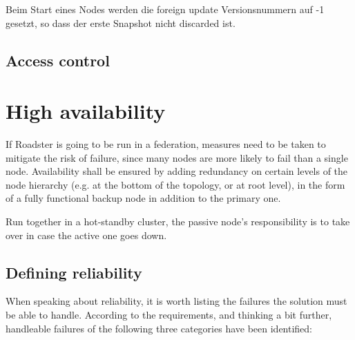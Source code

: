 Beim Start eines Nodes werden die foreign update Versionsnummern auf -1 gesetzt, so
dass der erste Snapshot nicht discarded ist.




\subsection{Access control}

\section{High availability}\label{sec:approach:ha}
If Roadster is going to be run in a federation, measures need to be taken to
mitigate the risk of failure, since many nodes are more likely to fail than a
single node. Availability shall be ensured by
adding redundancy on certain levels of the node hierarchy (e.g. at the bottom
of the topology, or at root level), in the form of a
fully functional backup node in addition to the primary one.

Run together in a hot-standby cluster, the passive node's responsibility is to
take over in case the active one goes down.

\subsection{Defining reliability}
When speaking about reliability, it is worth listing the failures the solution must be
able to handle. According to the requirements, and thinking a bit further,
handleable failures of the following three categories have been identified:

